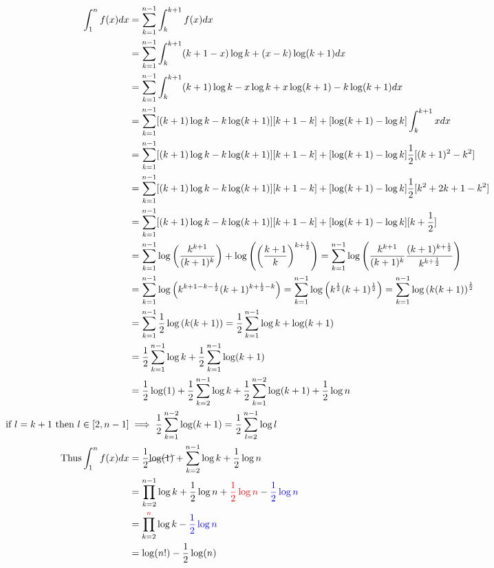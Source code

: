 \documentclass{article}
\begin{document}
\begin{align*}
  \int_{1}^n f(x) dx
  &=\sum_{k=1}^{n-1} \int_{k}^{k+1} f(x) dx\\
  &=\sum_{k=1}^{n-1} \int_{k}^{k+1} (k+1-x)\log k +(x-k)\log (k+1) dx\\
  &=\sum_{k=1}^{n-1} \int_{k}^{k+1} (k+1)\log k -x\log k +x\log
    (k+1)-k\log (k+1) dx\\
  &=\sum_{k=1}^{n-1} [(k+1)\log k -k\log (k+1)][k+1-k]  +[\log
    (k+1)-\log k]\int_{k}^{k+1} x dx\\
  &=\sum_{k=1}^{n-1} [(k+1)\log k -k\log (k+1)][k+1-k]  +[\log
    (k+1)-\log k]\frac{1}{2}[(k+1)^2 - k^2]\\
  &=\sum_{k=1}^{n-1} [(k+1)\log k -k\log (k+1)][k+1-k]  +[\log
    (k+1)-\log k]\frac{1}{2}[k^2+2k + 1 - k^2]\\
  &=\sum_{k=1}^{n-1} [(k+1)\log k -k\log (k+1)][k+1-k]  +[\log
    (k+1)-\log k][k + \frac{1}{2}]\\
  &=\sum_{k=1}^{n-1} \log \left(\frac{k^{k+1}}{(k+1)^k}\right) + \log\left(  \left(
    \frac{k+1}{k}\right)^{k + \frac{1}{2}}\right) =\sum_{k=1}^{n-1} \log \left(\frac{k^{k+1}}{(k+1)^k}
    \frac{(k+1)^{k + \frac{1}{2}}}{k^{k + \frac{1}{2}}}\right)\\
  &= \sum_{k=1}^{n-1} \log \left(  k^{k+1-k-\frac{1}{2}}(k+1)^{k +
    \frac{1}{2}-k}\right)
    = \sum_{k=1}^{n-1} \log \left(
    k^{\frac{1}{2}}(k+1)^{\frac{1}{2}}\right) = \sum_{k=1}^{n-1} \log \left(
    k(k+1)\right)^{\frac{1}{2}}\\
  &= \sum_{k=1}^{n-1} \frac{1}{2} \log \left(  k(k+1)\right) =
    \frac{1}{2}\sum_{k=1}^{n-1}  \log k + \log (k+1)\\
  &= \frac{1}{2}\sum_{k=1}^{n-1}  \log k + \frac{1}{2}\sum_{k=1}^{n-1} \log
    (k+1)\\
    &= \frac{1}{2}\log(1) + \frac{1}{2}\sum_{k=2}^{n-1}  \log k + \frac{1}{2}\sum_{k=1}^{n-2} \log
    (k+1) + \frac{1}{2}\log n\\
  \text{ if } l = k+1 \text{ then } l \in [2,n-1] &\implies \frac{1}{2}\sum_{k=1}^{n-2} \log
                        (k+1) = \frac{1}{2}\sum_{l=2}^{n-1} \log l\\
\text{Thus} \int_{1}^n f(x) dx
  &= \frac{1}{2}\cancel{ \log(1)}+ \sum_{k=2}^{n-1}  \log k  +
    \frac{1}{2}\log n\\
  &= \prod_{k=2}^{n-1} \log  k  + \frac{1}{2}\log n + \color{red}
    \frac{1}{2}\log n \color{black}-\color{blue} \frac{1}{2}\log n\color{black}\\
  &= \prod_{k=2}^{\color{red}n\color{black}} \log  k  -\color{blue} \frac{1}{2}\log n\color{black}\\
  &= \log(n!)  - \frac{1}{2}\log (n)
\end{align*}
\end{document}
